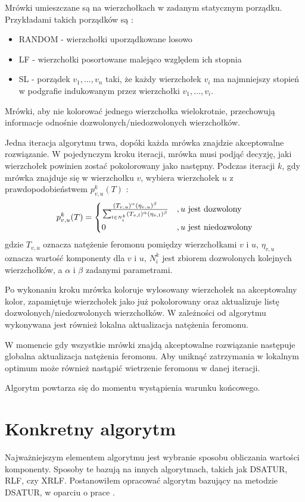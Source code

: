 \documentclass[11pt]{article}
\begin{document}
Mrówki umieszczane są na wierzchołkach w zadanym statycznym porządku. Przykładami takich porządków są \cite{CH}:
\begin{itemize}
  \item RANDOM - wierzchołki uporządkowane losowo
  \item LF - wierzchołki posortowane malejąco względem ich stopnia
  \item SL - porządek $v_1, \dots , v_n$ taki, że każdy wierzchołek $v_i$ ma najmniejszy stopień w podgrafie indukowanym przez wierzchołki $v_1, \dots , v_i$.
\end{itemize}

Mrówki, aby nie kolorować jednego wierzchołka wielokrotnie, przechowują informacje odnośnie dozwolonych/niedozwolonych wierzchołków.

Jedna iteracja algorytmu trwa, dopóki każda mrówka znajdzie akceptowalne rozwiązanie. W pojedynczym kroku iteracji, mrówka musi podjąć decyzję, jaki wierzchołek powinien zostać pokolorowany jako następny. Podczas iteracji $k$, gdy mrówka znajduje się w wierzchołku $v$, wybiera wierzchołek $u$ z prawdopodobieństwem $p^k_{v, u}(T)$ \cite{Bessedik}:
\begin{equation}
p^k_{v, u}(T)=
\begin{cases}
\frac{(T_{v,u})^{\alpha}  (\eta_{v,u})^{\beta}}{\sum_{l \in N_i^k} (T_{v,l})^{ \alpha}  (\eta_{v,l})^{\beta}} &, u $ jest dozwolony$\\
0 &, u $ jest niedozwolony$
\end{cases}
\end{equation}
gdzie $T_{v,u}$ oznacza natężenie feromonu pomiędzy wierzchołkami $v$ i $u$, $\eta_{v,u}$ oznacza wartość komponenty dla $v$ i $u$, $N_i^k$ jest zbiorem dozwolonych kolejnych wierzchołków, a $\alpha$ i $\beta$ zadanymi parametrami. 

Po wykonaniu kroku mrówka koloruje wylosowany wierzchołek na akceptowalny kolor, zapamiętuje wierzchołek jako już pokolorowany oraz aktualizuje listę dozwolonych/niedozwolonych wierzchołków. W zależności od algorytmu wykonywana jest również lokalna aktualizacja natężenia feromonu. 

W momencie gdy wszystkie mrówki znajdą akceptowalne rozwiązanie następuje globalna aktualizacja natężenia feromonu. Aby uniknąć zatrzymania w lokalnym optimum może również nastąpić wietrzenie feromonu w danej iteracji. 

Algorytm powtarza się do momentu wystąpienia warunku końcowego.

\section{Konkretny algorytm}
Najważniejszym elementem algorytmu jest wybranie sposobu obliczania wartości komponenty. Sposoby te bazują na innych algorytmach, takich jak DSATUR\cite{Bessedik, CH, ASLSCT}, RLF\cite{ASLSCT, Bessedik, CH, SEH}, czy XRLF\cite{ASLSCT}.
Postanowiłem opracować algorytm bazujący na metodzie DSATUR, w oparciu o prace \cite{Bessedik, CH}. 
\end{document}
